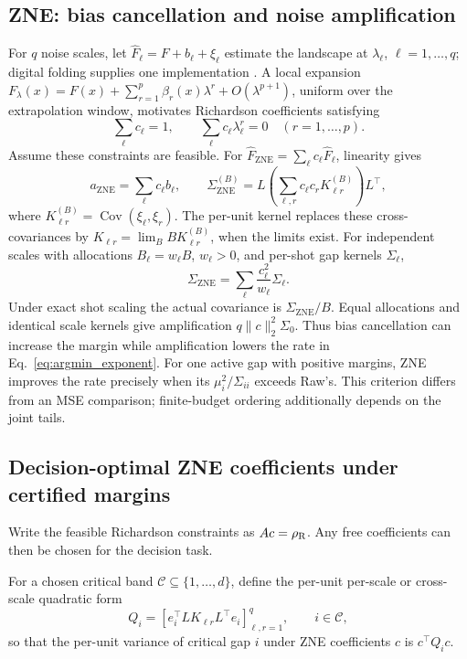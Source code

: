 \documentclass[a4paper,onecolumn,unpublished,nopdfoutputerror]{quantumarticle}
\theoremstyle{plain}
\theoremstyle{definition}
\newcommand{\Cov}{\operatorname{Cov}}
\newcommand{\calC}{\mathcal{C}}
\newcommand{\ZNE}{\mathrm{ZNE}}
\newcommand{\1}{\mathbf{1}}
\begin{document}
\subsection{ZNE: bias cancellation and noise amplification}
\label{sec:zne_signature}
For $q$ noise scales, let $\widehat F_\ell=F+b_\ell+\xi_\ell$ estimate the landscape at $\lambda_\ell$, $\ell=1,\ldots,q$; digital folding supplies one implementation \cite{GiurgicaTiron2020}. A local expansion $F_\lambda(x)=F(x)+\sum_{r=1}^p\beta_r(x)\lambda^r+O(\lambda^{p+1})$, uniform over the extrapolation window, motivates Richardson coefficients satisfying
\[
\sum_\ell c_\ell=1,\qquad \sum_\ell c_\ell\lambda_\ell^r=0\quad(r=1,\ldots,p).
\]
Assume these constraints are feasible. For $\widehat F_{\ZNE}=\sum_\ell c_\ell\widehat F_\ell$, linearity gives
\begin{equation}
a_{\ZNE}=\sum_\ell c_\ell b_\ell,\qquad
\Sigma_{\ZNE}^{(B)}=L\left(\sum_{\ell,r}c_\ell c_r K_{\ell r}^{(B)}\right)L^\top,
\end{equation}
where $K_{\ell r}^{(B)}=\Cov(\xi_\ell,\xi_r)$. The per-unit kernel replaces these cross-covariances by $K_{\ell r}=\lim_B BK_{\ell r}^{(B)}$, when the limits exist. For independent scales with allocations $B_\ell=w_\ell B$, $w_\ell>0$, and per-shot gap kernels $\Sigma_\ell$,
\begin{equation}
\Sigma_{\ZNE}=\sum_\ell \frac{c_\ell^2}{w_\ell}\Sigma_\ell.
\end{equation}
Under exact shot scaling the actual covariance is $\Sigma_{\ZNE}/B$. Equal allocations and identical scale kernels give amplification $q\|c\|_2^2\Sigma_0$. Thus bias cancellation can increase the margin while amplification lowers the rate in Eq.~\eqref{eq:argmin_exponent}. For one active gap with positive margins, ZNE improves the rate precisely when its $\mu_i^2/\Sigma_{ii}$ exceeds Raw's. This criterion differs from an MSE comparison; finite-budget ordering additionally depends on the joint tails.

\subsection{Decision-optimal ZNE coefficients under certified margins}

Write the feasible Richardson constraints as $Ac=\rho_{\rm R}$. Any free coefficients can then be chosen for the decision task.

For a chosen critical band $\calC\subseteq\{1,\ldots,d\}$, define the per-unit per-scale or cross-scale quadratic form
\begin{equation}
    Q_i=\left[ e_i^\top L K_{\ell r}L^\top e_i\right]_{\ell,r=1}^q,
    \qquad i\in\calC,
\end{equation}
so that the per-unit variance of critical gap $i$ under ZNE coefficients $c$ is $c^\top Q_i c$.
\end{document}

